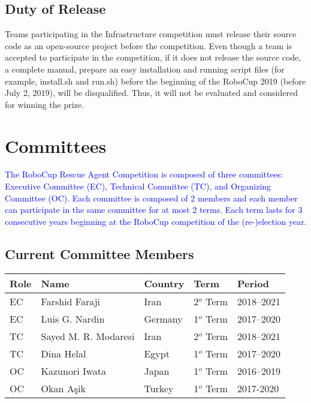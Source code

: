 \documentclass{article}
\begin{document}
\subsection{Duty of Release}
Teams participating in the Infrastructure competition must release their source code as an open-source project before the competition. Even though a team is accepted to participate in the competition, if it does not release the source code, a complete manual, prepare an easy installation and running script files (for example, install.sh and run.sh) before the beginning of the RoboCup 2019 (before July 2, 2019), will be disqualified. Thus, it will not be evaluated and considered for winning the prize.
\section{Committees}
\label{sec:committees}
\textcolor{blue}{The RoboCup Rescue Agent Competition is composed of three committees: Executive Committee (EC), Technical Committee (TC), and Organizing Committee (OC). Each committee is composed of 2 members and each member can participate in the same committee for at most 2 terms. Each term lasts for 3 consecutive years beginning at the RoboCup competition of the (re-)election year.}
\subsection{Current Committee Members}
\begin{table}[H]
\begin{tabular}{lllll}
  \toprule
  \textbf{Role}   & \textbf{Name}         & \textbf{Country}  & \textbf{Term} &
  \textbf{Period}\\
    \midrule
    EC            & Farshid Faraji        & Iran              & 2${^o}$ Term  &
    2018--2021\\
    \hline
    EC            & Luis G. Nardin        & Germany           & 1${^o}$ Term  &
    2017--2020\\
    \hline
    TC            & Sayed M. R. Modaresi  & Iran              & 2${^o}$ Term  &
    2018--2021\\
    \hline
    TC            & Dina Helal            & Egypt             & 1${^o}$ Term  &
    2017--2020\\
    \hline
    OC            & Kazunori Iwata        & Japan             & 1${^o}$ Term  &
    2016--2019\\
    \hline
    OC            & Okan A{\c s}ik        & Turkey            & 1${^o}$ Term  &
    2017-2020\\
    \bottomrule
\end{tabular}
\end{table}
\end{document}
